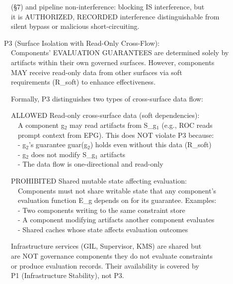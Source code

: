 \begin{caxiom}
\begin{claddisp}
~~~~(\S{}7) and pipeline non-interference: blocking IS interference, but\\
~~~~it is AUTHORIZED, RECORDED interference \textemdash{} distinguishable from\\
~~~~silent bypass or malicious short-circuiting.
\par\smallskip
~~P3 (Surface Isolation with Read-Only Cross-Flow):\\
~~~~Components' EVALUATION GUARANTEES are determined solely by\\
~~~~artifacts within their own governed surfaces. However, components\\
~~~~MAY receive read-only data from other surfaces via soft\\
~~~~requirements (R\_soft) to enhance effectiveness.
\par\smallskip
~~~~Formally, P3 distinguishes two types of cross-surface data flow:
\par\smallskip
~~~~ALLOWED \textemdash{} Read-only cross-surface data (soft dependencies):\\
~~~~~~A component g$_2$ may read artifacts from S\_g$_1$ (e.g., ROC reads\\
~~~~~~prompt context from EPG). This does NOT violate P3 because:\\
~~~~~~- g$_2$'s guarantee guar(g$_2$) holds even without this data (R\_soft)\\
~~~~~~- g$_2$ does not modify S\_g$_1$ artifacts\\
~~~~~~- The data flow is one-directional and read-only
\par\smallskip
~~~~PROHIBITED \textemdash{} Shared mutable state affecting evaluation:\\
~~~~~~Components must not share writable state that any component's\\
~~~~~~evaluation function E\_g depends on for its guarantee. Examples:\\
~~~~~~- Two components writing to the same constraint store\\
~~~~~~- A component modifying artifacts another component evaluates\\
~~~~~~- Shared caches whose state affects evaluation outcomes
\par\smallskip
~~~~Infrastructure services (GIL, Supervisor, KMS) are shared but\\
~~~~are NOT governance components \textemdash{} they do not evaluate constraints\\
~~~~or produce evaluation records. Their availability is covered by\\
~~~~P1 (Infrastructure Stability), not P3.
\end{claddisp}


\end{caxiom}

